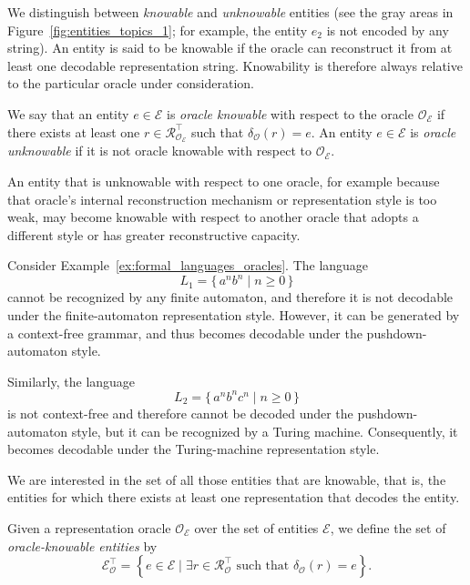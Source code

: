 We distinguish between \emph{knowable} and \emph{unknowable} entities (see the gray areas in Figure~\ref{fig:entities_topics_1}; for example, the entity $e_2$ is not encoded by any string). An entity is said to be knowable if the oracle can reconstruct it from at least one decodable representation string. Knowability is therefore always relative to the particular oracle under consideration.

\begin{definition}
\label{def:knowable_entity}
We say that an entity $e \in \mathcal{E}$ is \emph{oracle knowable} with respect to the oracle $\mathcal{O}_{\mathcal{E}}$ if there exists at least one $r \in \mathcal{R}_{\mathcal{O}_{\mathcal{E}}}^{\top}$ such that $\delta_\mathcal{O}(r) = e$. An entity $e \in \mathcal{E}$ is \emph{oracle unknowable} if it is not oracle knowable with respect to $\mathcal{O}_{\mathcal{E}}$.
\end{definition}

An entity that is unknowable with respect to one oracle, for example because that oracle's internal reconstruction mechanism or representation style is too weak, may become knowable with respect to another oracle that adopts a different style or has greater reconstructive capacity.

\begin{example}
Consider Example~\ref{ex:formal_languages_oracles}. The language
\[
L_1 = \{\, a^n b^n \mid n \ge 0 \,\}
\]
cannot be recognized by any finite automaton, and therefore it is not decodable under the finite-automaton representation style. However, it can be generated by a context-free grammar, and thus becomes decodable under the pushdown-automaton style.

Similarly, the language
\[
L_2 = \{\, a^n b^n c^n \mid n \ge 0 \,\}
\]
is not context-free and therefore cannot be decoded under the pushdown-automaton style, but it can be recognized by a Turing machine. Consequently, it becomes decodable under the Turing-machine representation style.
\end{example}

We are interested in the set of all those entities that are knowable, that is, the entities for which there exists at least one representation that decodes the entity.

\begin{definition}
Given a representation oracle $\mathcal{O}_{\mathcal{E}}$ over the set of entities $\mathcal{E}$, we define the set of \emph{oracle-knowable entities} by
\[
\mathcal{E}_{\mathcal{O}}^{\top} = \left\{e\in\mathcal{E} \mid
\exists r\in\mathcal{R}_{\mathcal{O}}^{\top}
\text{ such that }
\delta_{\mathcal{O}}(r)=e
\right\}.
\]
\end{definition}

